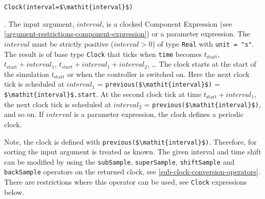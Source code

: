 \begin{operatordefinition*}[Clock]\label{modelica:clock-interval}
\begin{synopsis}\begin{lstlisting}
Clock(interval=$\mathit{interval}$)
\end{lstlisting}\end{synopsis}
\begin{semantics}
.
The input argument, $\mathit{interval}$, is a clocked Component Expression (see \cref{argument-restrictions-component-expression}) or a parameter expression.
The $\mathit{interval}$ must be strictly positive ($\mathit{interval} > 0$) of type \lstinline!Real! with \lstinline!unit = "s"!.
The result is of base type \lstinline!Clock! that ticks when \lstinline!time! becomes $t_{\mathrm{start}}$, $t_{\mathrm{start}} + \mathit{interval}_{1}$, $t_{\mathit{start}} + \mathit{interval}_{1} + \mathit{interval}_{2}$, \@\ldots{}
The clock starts at the start of the simulation $t_{\mathrm{start}}$ or when the controller is switched on.
Here the next clock tick is scheduled at $\mathit{interval}_{1}$ = \lstinline!previous($\mathit{interval}$)! = \lstinline!$\mathit{interval}$.start!.
At the second clock tick at time $t_{\mathrm{start}} + \mathit{interval}_{1}$, the next clock tick is scheduled at $\mathit{interval}_{2}$ = \lstinline!previous($\mathit{interval}$)!, and so on.
If $\mathit{interval}$ is a parameter expression, the clock defines a periodic clock.

\begin{nonnormative}
Note, the clock is defined with \lstinline!previous($\mathit{interval}$)!.  Therefore, for sorting the input argument is treated as known.  The given interval and time shift can be modified by using the \lstinline!subSample!, \lstinline!superSample!, \lstinline!shiftSample! and \lstinline!backSample! operators on the returned clock, see \cref{sub-clock-conversion-operators}.  There are restrictions where this operator can be used, see \lstinline!Clock! expressions below.
\end{nonnormative}
\end{semantics}
\end{operatordefinition*}

